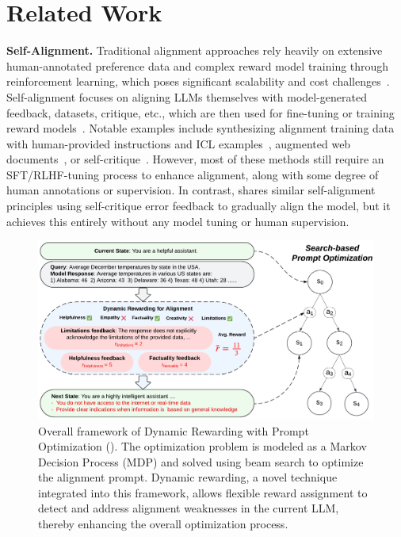 \section{Related Work}
\vspace{-5pt}


\noindent \textbf{Self-Alignment.}
Traditional alignment approaches rely heavily on extensive human-annotated preference data and complex reward model training through reinforcement learning, which poses significant scalability and cost challenges~\cite{ouyang2022training}. Self-alignment focuses on aligning LLMs themselves with model-generated feedback, datasets, critique, etc., which are then used for fine-tuning or training reward models~\cite{lee2023rlaif, bai2022training, cao2024towards, wang2024step, guo2024human}. Notable examples include synthesizing alignment training data with human-provided instructions and ICL examples~\cite{wang2022self, kim2023aligning, sun2024principle}, augmented web documents~\cite{li2023self}, or self-critique~\cite{bai2022constitutional, madaan2024self}. However, most of these methods still require an SFT/RLHF-tuning process to enhance alignment, along with some degree of human annotations or supervision. In contrast, \ours shares similar self-alignment principles using self-critique error feedback to gradually align the model, but it achieves this entirely without any model tuning or human supervision.



\begin{figure}[ht]
    \centering
    \includegraphics[width=0.95\linewidth]{images/Dynamic_Rewarding.pdf}
    \vspace{-8pt}
    \caption{Overall framework of Dynamic Rewarding with Prompt Optimization (\ours). The optimization problem is modeled as a Markov Decision Process (MDP) and solved using beam search to optimize the alignment prompt. Dynamic rewarding, a novel technique integrated into this framework, allows flexible reward assignment to detect and address alignment weaknesses in the current LLM, thereby enhancing the overall optimization process.
    }
    \label{fig:dynamic_rewarding}
    \vspace{-15pt}
\end{figure}




